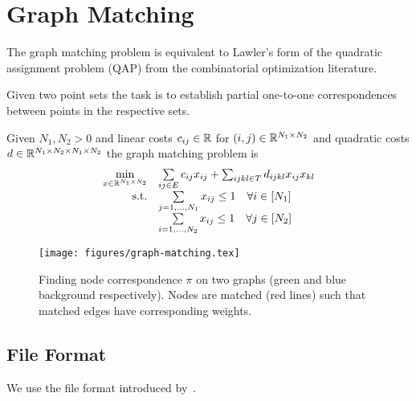 \section{Graph Matching}
\label{sec:graph-matching}

The graph matching problem is equivalent to Lawler's form of the quadratic assignment problem (QAP) from the combinatorial optimization literature.

Given two point sets the task is to establish partial one-to-one correspondences between points in the respective sets.

\begin{definition}
Given $N_1,N_2 > 0$ and linear costs $c_{ij} \in \mathbb{R}$ for $(i,j) \in \mathbb{R}^{N_1 \times N_2}$ and quadratic costs $d \in \mathbb{R}^{N_1 \times N_2 \times N_1 \times N_2}$ the graph matching problem is
\begin{equation}
    \begin{array}{rl}
    \min\limits_{x \in \mathbb{R}^{N_1 \times N_2}} & \sum\limits_{ij \in E} c_{ij} x_{ij} + \sum_{ijkl \in T} d_{ijkl} x_{ij} x_{kl} \\ 
    \text{s.t.} 
    & \sum\limits_{j=1,\ldots,N_1} x_{ij} \leq 1 \quad \forall i\in [N_1] \\
    & \sum\limits_{i=1,\ldots,N_2} x_{ij} \leq 1 \quad \forall j\in [N_2] \\
    \end{array}
\end{equation}
\end{definition}

\begin{figure}[H]
    \begin{center}
        \texttt{[image: figures/graph-matching.tex]}
        \caption{Finding node correspondence $\pi$ on two graphs (green and blue background respectively). Nodes are matched (red lines) such that matched edges have corresponding weights.}
        \label{fig:cell-tracking}
    \end{center}
\end{figure}

\subsection{File Format}
\label{sec:graph-matching-file-format}

We use the file format introduced by~\cite{torresani2012dual}.

